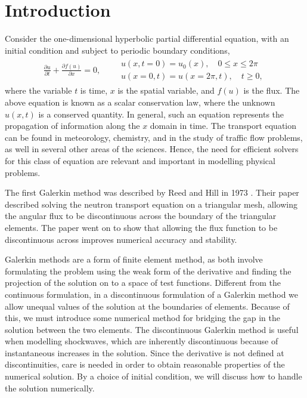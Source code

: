 \section{Introduction}

Consider the one-dimensional hyperbolic partial differential equation, with an initial condition and subject to periodic boundary conditions,
\begin{align}
	\frac{\partial u}{\partial t} + \frac{\partial f(u)}{\partial x} = 0, \qquad 
    \begin{array}{ll}
		u(x,t=0)=u_0(x), \quad 0 \leq x \leq 2\pi\\ 
        u(x=0,t)=u(x=2\pi,t), \quad t \geq 0, 
	\end{array}\label{eq:problem}
\end{align}
where the variable $t$ is time, $x$ is the spatial variable, and $f(u)$ is the flux.
The above equation is known as a scalar conservation law, where the unknown $u(x,t)$ is a conserved quantity.
In general, such an equation represents the propagation of information along the $x$ domain in time.
The transport equation can be found in meteorology, chemistry, and in the study of traffic flow problems, as well in several other areas of the sciences.
Hence, the need for efficient solvers for this class of equation are relevant and important in modelling physical problems.

The first Galerkin method was described by Reed and Hill in 1973 \cite{Reed_Hill_1973}.
Their paper described solving the neutron transport equation on a triangular mesh, allowing the angular flux to be discontinuous across the boundary of the triangular elements. 
The paper went on to show that allowing the flux function to be discontinuous across improves numerical accuracy and stability.

Galerkin methods are a form of finite element method, as both involve formulating the problem using the weak form of the derivative and finding the projection of the solution on to a space of test functions.
Different from the continuous formulation, in a discontinuous formulation of a Galerkin method we allow unequal values of the solution at the boundaries of elements.
Because of this, we must introduce some numerical method for bridging the gap in the solution between the two elements.
The discontinuous Galerkin method is useful when modelling shockwaves, which are inherently discontinuous because of instantaneous increases in the solution.
Since the derivative is not defined at discontinuities, care is needed in order to obtain reasonable properties of the numerical solution.
By a choice of initial condition, we will discuss how to handle the solution numerically. 




